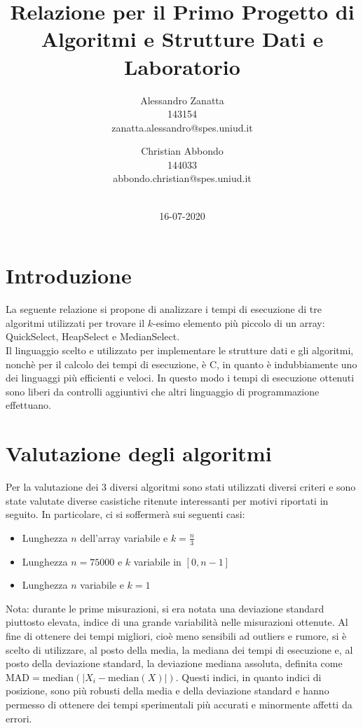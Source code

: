 \documentclass{article}
\title{Relazione per il Primo Progetto di Algoritmi e Strutture Dati e Laboratorio}
\date{16-07-2020}
\author{Alessandro Zanatta \\ 143154 \\ zanatta.alessandro@spes.uniud.it\\ \and Christian Abbondo \\ 144033 \\ abbondo.christian@spes.uniud.it\\ \\}
\begin{document}
	\maketitle
	\newpage
	
	
	\tableofcontents	
	\newpage
	
	\section{Introduzione}
	La seguente relazione si propone di analizzare i tempi di esecuzione di tre algoritmi utilizzati per trovare il $ k $-esimo elemento più piccolo di un array: QuickSelect, HeapSelect e MedianSelect.
	\\ 
	Il linguaggio scelto e utilizzato per implementare le strutture dati e gli algoritmi, nonchè per il calcolo dei tempi di esecuzione, è C, in quanto è indubbiamente uno dei linguaggi più efficienti e veloci. In questo modo i tempi di esecuzione ottenuti sono liberi da controlli aggiuntivi che altri linguaggio di programmazione effettuano.
	\newpage
	
	
	\section{Valutazione degli algoritmi}
	Per la valutazione dei 3 diversi algoritmi sono stati utilizzati diversi criteri e sono state valutate diverse casistiche ritenute interessanti per motivi riportati in seguito. In particolare, ci si soffermerà sui seguenti casi:
	
	\begin{itemize}
		\item Lunghezza $n$ dell'array variabile e $k=\frac{n}{3}$
		\item Lunghezza $n=75000$ e $k$ variabile in $[0,n-1]$
		\item Lunghezza $n$ variabile e $k=1$
	\end{itemize}
	
	Nota: durante le prime misurazioni, si era notata una deviazione standard piuttosto elevata, indice di una grande variabilità nelle misurazioni ottenute. Al fine di ottenere dei tempi migliori, cioè meno sensibili ad outliers e rumore, si è scelto di utilizzare, al posto della media, la mediana dei tempi di esecuzione e, al posto della deviazione standard, la deviazione mediana assoluta, definita come $\textrm{MAD}=\textrm{median}\left(\mathopen|X_{i}-\textrm{median}\left(X\right)\mathclose|\right)$. Questi indici, in quanto indici di posizione, sono più robusti della media e della deviazione standard e hanno permesso di ottenere dei tempi sperimentali più accurati e minormente affetti da errori.
	\newpage
	
\end{document}
